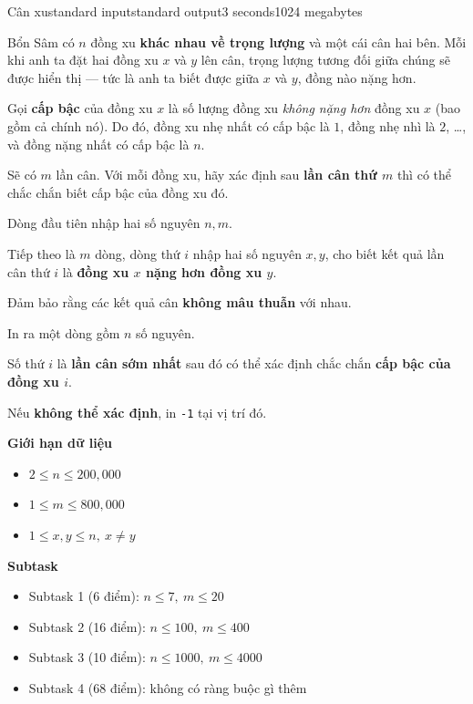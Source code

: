 \begin{problem}{Cân xu}{standard input}{standard output}{3 seconds}{1024 megabytes}

Bổn Sâm có $n$ đồng xu \textbf{khác nhau về trọng lượng} và một cái cân hai bên.  
Mỗi khi anh ta đặt hai đồng xu $x$ và $y$ lên cân, trọng lượng tương đối giữa chúng sẽ được hiển thị --- tức là anh ta biết được giữa $x$ và $y$, đồng nào nặng hơn.

Gọi \textbf{cấp bậc} của đồng xu $x$ là số lượng đồng xu \textit{không nặng hơn} đồng xu $x$ (bao gồm cả chính nó).  
Do đó, đồng xu nhẹ nhất có cấp bậc là $1$, đồng nhẹ nhì là $2$, \ldots, và đồng nặng nhất có cấp bậc là $n$.

Sẽ có $m$ lần cân. Với mỗi đồng xu, hãy xác định sau \textbf{lần cân thứ $m$} thì có thể chắc chắn biết cấp bậc của đồng xu đó.


\InputFile
Dòng đầu tiên nhập hai số nguyên $n, m$.

Tiếp theo là $m$ dòng, dòng thứ $i$ nhập hai số nguyên $x, y$, cho biết kết quả lần cân thứ $i$ là \textbf{đồng xu $x$ nặng hơn đồng xu $y$}.

Đảm bảo rằng các kết quả cân \textbf{không mâu thuẫn} với nhau.


\OutputFile
In ra một dòng gồm $n$ số nguyên.

Số thứ $i$ là \textbf{lần cân sớm nhất} sau đó có thể xác định chắc chắn \textbf{cấp bậc của đồng xu $i$}.

Nếu \textbf{không thể xác định}, in \texttt{-1} tại vị trí đó.


\Scoring
\textbf{Giới hạn dữ liệu}

\begin{itemize}
\item $2 \le n \le 200{,}000$
\item $1 \le m \le 800{,}000$
\item $1 \le x, y \le n,\ x \ne y$
\end{itemize}

\textbf{Subtask}

\begin{itemize}
\item Subtask 1 (6 điểm): $n \le 7,\ m \le 20$
\item Subtask 2 (16 điểm): $n \le 100,\ m \le 400$
\item Subtask 3 (10 điểm): $n \le 1000,\ m \le 4000$
\item Subtask 4 (68 điểm): không có ràng buộc gì thêm
\end{itemize}


\end{problem}
